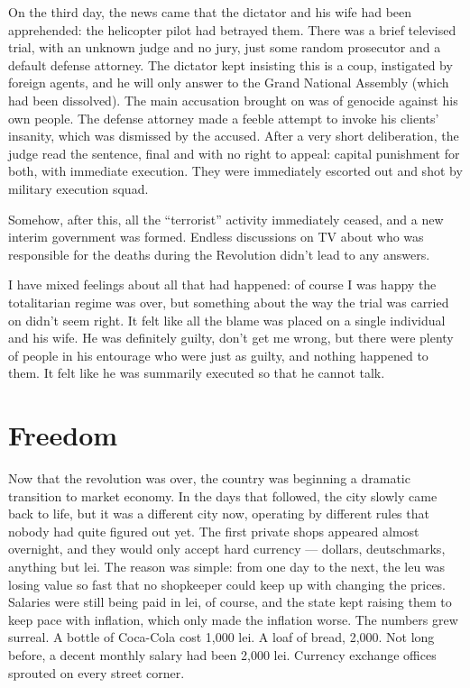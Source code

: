 \documentclass[12pt]{book}
\begin{document}
On the third day, the news came that the dictator and his wife had been
apprehended: the helicopter pilot had betrayed them. There was a brief
televised trial, with an unknown judge and no jury, just some random
prosecutor and a default defense attorney. The dictator kept insisting
this is a coup, instigated by foreign agents, and he will only answer to
the Grand National Assembly (which had been dissolved). The main
accusation brought on was of genocide against his own people. The
defense attorney made a feeble attempt to invoke his clients' insanity,
which was dismissed by the accused. After a very short deliberation, the
judge read the sentence, final and with no right to appeal: capital
punishment for both, with immediate execution. They were immediately
escorted out and shot by military execution squad.

Somehow, after this, all the ``terrorist'' activity immediately ceased,
and a new interim government was formed. Endless discussions on TV about
who was responsible for the deaths during the Revolution didn't lead to
any answers.

I have mixed feelings about all that had happened: of course I was happy
the totalitarian regime was over, but something about the way the trial
was carried on didn't seem right. It felt like all the blame was placed
on a single individual and his wife. He was definitely guilty, don't get
me wrong, but there were plenty of people in his entourage who were just
as guilty, and nothing happened to them. It felt like he was summarily
executed so that he cannot talk.


\section{Freedom}

Now that the revolution was over, the country was beginning a dramatic
transition to market economy. In the days that followed, the city slowly
came back to life, but it was a different city now, operating by
different rules that nobody had quite figured out yet. The first private
shops appeared almost overnight, and they would only accept hard
currency --- dollars, deutschmarks, anything but lei. The reason was
simple: from one day to the next, the leu was losing value so fast that
no shopkeeper could keep up with changing the prices. Salaries were
still being paid in lei, of course, and the state kept raising them to
keep pace with inflation, which only made the inflation worse. The
numbers grew surreal. A bottle of Coca-Cola cost 1,000 lei. A loaf of
bread, 2,000. Not long before, a decent monthly salary had been 2,000
lei. Currency exchange offices sprouted on every street corner.
\end{document}
